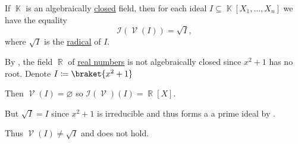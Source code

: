 \begin{theorem}\label{thm:geometric_nullstellensatz}\mcite\cite[70]{КоцевСидеров2016}
  If \( \BbbK \) is an algebraically \hyperref[def:algebraically_closed_field]{closed} field, then for each ideal \( I \subseteq \BbbK[X_1, \ldots, X_n] \) we have the equality
  \begin{equation*}
    \mathcal{I}(\mscrV(I)) = \sqrt I,
  \end{equation*}
  where \( \sqrt I \) is the \hyperref[def:radical_ideal]{radical} of \( I \).
\end{theorem}

\begin{example}\label{ex:geometric_nullstellensatz_does_not_hold_for_reals}
  By , the field \( \BbbR \) of \hyperref[def:real_numbers]{real numbers} is not algebraically closed since \( x^2 + 1 \) has no root. Denote \( I \coloneqq \braket{x^2 + 1} \)

  Then \( \mscrV(I) = \varnothing \) so \( \mathcal{I}(\mscrV)(I) = \BbbR[X] \).

  But \( \sqrt{I} = I \) since \( x^2 + 1 \) is irreducible and thus forms a a prime ideal by .

  Thus \( \mscrV(I) \neq \sqrt{I} \) and  does not hold.
\end{example}

